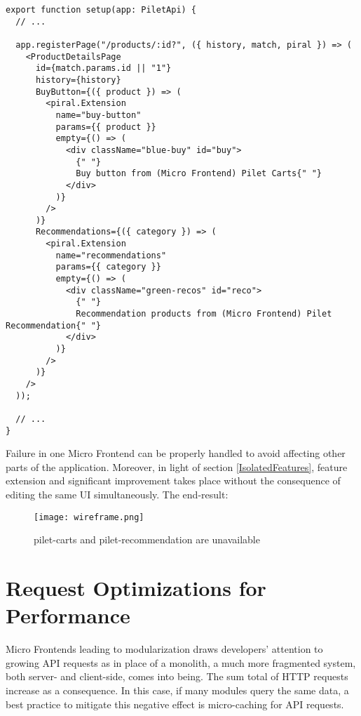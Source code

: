 \documentclass[a4paper]{book}
\begin{document}
\begin{lstlisting}[caption={pilet-products index.tsx}]
  export function setup(app: PiletApi) {
  // ...

  app.registerPage("/products/:id?", ({ history, match, piral }) => (
    <ProductDetailsPage
      id={match.params.id || "1"}
      history={history}
      BuyButton={({ product }) => (
        <piral.Extension
          name="buy-button"
          params={{ product }}
          empty={() => (
            <div className="blue-buy" id="buy">
              {" "}
              Buy button from (Micro Frontend) Pilet Carts{" "}
            </div>
          )}
        />
      )}
      Recommendations={({ category }) => (
        <piral.Extension
          name="recommendations"
          params={{ category }}
          empty={() => (
            <div className="green-recos" id="reco">
              {" "}
              Recommendation products from (Micro Frontend) Pilet Recommendation{" "}
            </div>
          )}
        />
      )}
    />
  ));

  // ...
}
\end{lstlisting}

Failure in one Micro Frontend can be properly handled to avoid affecting other parts of the application. Moreover, in light of section \ref{IsolatedFeatures}, feature extension and significant improvement takes place without the consequence of editing the same UI simultaneously. The end-result:

\begin{figure}[h!]
  \centering
  \captionsetup{justification=centering}
  \texttt{[image: wireframe.png]}
  \caption{pilet-carts and pilet-recommendation are unavailable}
  \label{fig:wireframe1}
\end{figure}

\section{Request Optimizations for Performance}
Micro Frontends leading to modularization draws developers’ attention to growing API requests as in place of a monolith, a much more fragmented system, both server- and client-side, comes into being. The sum total of HTTP requests increase as a consequence. In this case, if many modules query the same data, a best practice to mitigate this negative effect is micro-caching for API requests. \cite{Rap20}
\end{document}

